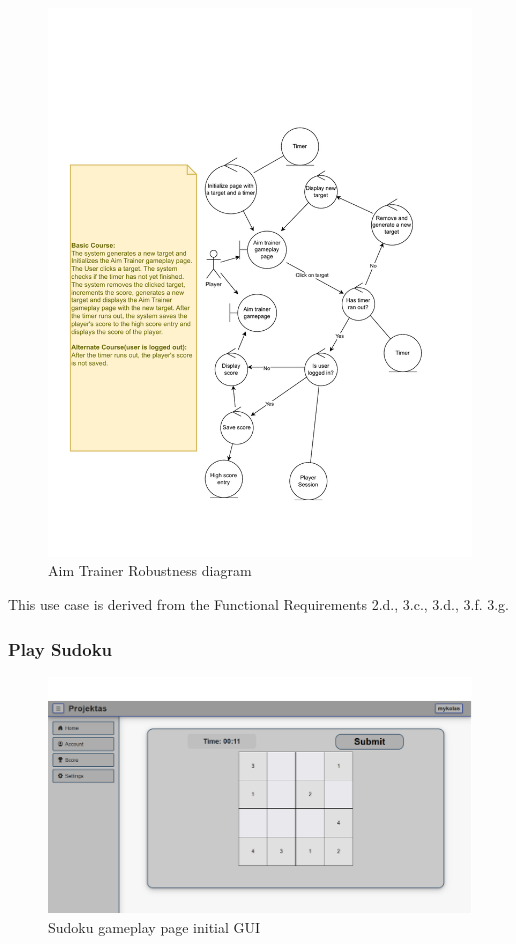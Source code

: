 \documentclass[11pt,a4paper]{article}
\begin{document}
\begin{figure}[H]
    \centering
    \includegraphics[width=1\textwidth,keepaspectratio]{PSI_3rd_trial/robustness/aim_trainer.drawio.pdf}
    \caption{Aim Trainer Robustness diagram}
    \label{fig:aim_trainer_diagram}
\end{figure}

This use case is derived from the Functional Requirements 2.d., 3.c., 3.d., 3.f. 3.g.

\subsubsection{Play Sudoku}

\begin{figure}[H]
    \centering
    \includegraphics[width=1\textwidth,keepaspectratio]{PSI_3rd_trial/PNGs/sudoku_1.png}
    \caption{Sudoku gameplay page initial GUI}
    \label{fig:sudoku_1}
\end{figure}
\end{document}
